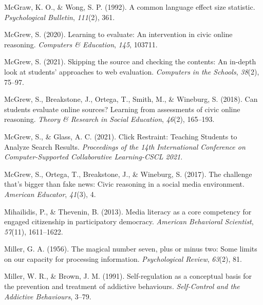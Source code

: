 \documentclass[letterpaper, nobind]{templates/ociamthesis}
\newlength{\cslhangindent}
\newenvironment{CSLReferences}[2] %
 {%
  \setlength{\parindent}{0pt}
  \ifodd #1
  \let\oldpar\par
  \def\par{\hangindent=\cslhangindent\oldpar}
  \fi
  \setlength{\parskip}{1mm}
  \setlength{\baselineskip}{6mm}
 }%
 {}
\begin{document}
\begin{CSLReferences}{1}{0}
\leavevmode{}%
McGraw, K. O., \& Wong, S. P. (1992). A common language effect size statistic. \emph{Psychological Bulletin}, \emph{111}(2), 361.

\leavevmode{}%
McGrew, S. (2020). Learning to evaluate: An intervention in civic online reasoning. \emph{Computers \& Education}, \emph{145}, 103711.

\leavevmode{}%
McGrew, S. (2021). Skipping the source and checking the contents: An in-depth look at students' approaches to web evaluation. \emph{Computers in the Schools}, \emph{38}(2), 75--97.

\leavevmode{}%
McGrew, S., Breakstone, J., Ortega, T., Smith, M., \& Wineburg, S. (2018). Can students evaluate online sources? Learning from assessments of civic online reasoning. \emph{Theory \& Research in Social Education}, \emph{46}(2), 165--193.

\leavevmode{}%
McGrew, S., \& Glass, A. C. (2021). Click {Restraint}: Teaching {Students} to {Analyze Search Results}. \emph{Proceedings of the 14th {International Conference} on {Computer}-{Supported Collaborative Learning}-{CSCL} 2021}.

\leavevmode{}%
McGrew, S., Ortega, T., Breakstone, J., \& Wineburg, S. (2017). The challenge that's bigger than fake news: Civic reasoning in a social media environment. \emph{American Educator}, \emph{41}(3), 4.

\leavevmode{}%
Mihailidis, P., \& Thevenin, B. (2013). Media literacy as a core competency for engaged citizenship in participatory democracy. \emph{American Behavioral Scientist}, \emph{57}(11), 1611--1622.

\leavevmode{}%
Miller, G. A. (1956). The magical number seven, plus or minus two: Some limits on our capacity for processing information. \emph{Psychological Review}, \emph{63}(2), 81.

\leavevmode{}%
Miller, W. R., \& Brown, J. M. (1991). Self-regulation as a conceptual basis for the prevention and treatment of addictive behaviours. \emph{Self-Control and the Addictive Behaviours}, 3--79.


\end{CSLReferences}
\end{document}
